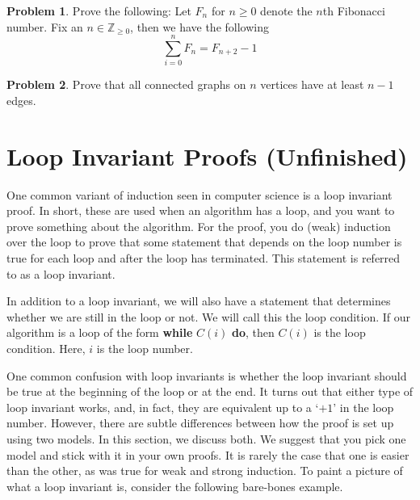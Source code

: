 \documentclass{article}
\newcommand{\ZZ}{\mathbb{Z}_{\geq 0}}
\theoremstyle{plain}
\theoremstyle{definition}
\newtheorem{problem}{Problem}
\begin{document}
\begin{problem}
    Prove the following: Let \(F_n\) for \(n \geq 0\) denote the \(n\)th Fibonacci number. Fix an \(n \in \ZZ\), then we have the following
    \[\sum_{i = 0}^n F_n = F_{n+2} - 1\]
\end{problem}

\begin{problem}
    Prove that all connected graphs on \(n\) vertices have at least \(n-1\) edges.
\end{problem}

\section{Loop Invariant Proofs (Unfinished)}\label{sec_loop_inv}

One common variant of induction seen in computer science is a loop invariant proof. In short, these are used when an algorithm has a loop, and you want to prove something about the algorithm. For the proof, you do (weak) induction over the loop to prove that some statement that depends on the loop number is true for each loop and after the loop has terminated. This statement is referred to as a loop invariant.

In addition to a loop invariant, we will also have a statement that determines whether we are still in the loop or not. We will call this the loop condition. If our algorithm is a loop of the form \textbf{while} \(C(i)\) \textbf{do}, then \(C(i)\) is the loop condition. Here, \(i\) is the loop number.

One common confusion with loop invariants is whether the loop invariant should be true at the beginning of the loop or at the end. It turns out that either type of loop invariant works, and, in fact, they are equivalent up to a `\(+1\)' in the loop number. However, there are subtle differences between how the proof is set up using two models. In this section, we discuss both. We suggest that you pick one model and stick with it in your own proofs. It is rarely the case that one is easier than the other, as was true for weak and strong induction. To paint a picture of what a loop invariant is, consider the following bare-bones example.
\end{document}
